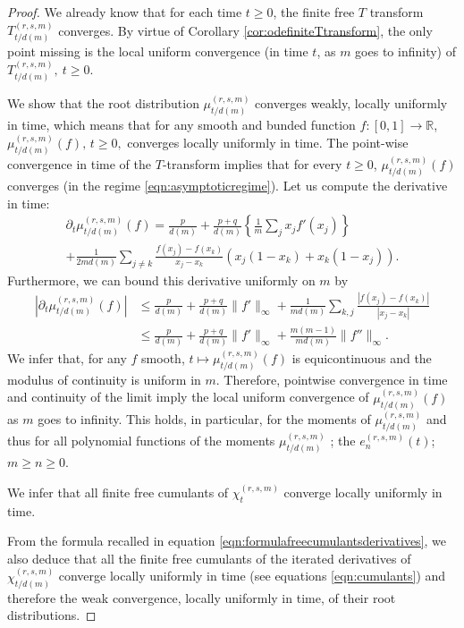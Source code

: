 \documentclass[12pt,reqno]{amsart}
\begin{document}
\begin{proof}
We already know that for each time $t \geq 0$, the finite free $T$ transform $T^{(r,s,m)}_{t/d(m)}$ converges. By virtue of Corollary \ref{cor:odefiniteTtransform}, the only point missing is the local uniform convergence (in time $t$, as $m$ goes to infinity) of $T^{(r,s,m)}_{t/d(m)},~t\geq 0$.  

We show that the root distribution $\mu^{(r,s,m)}_{t/d(m)}$ converges weakly, locally uniformly in time, which means that for any smooth and bunded function $f: [0,1]\to\mathbb{R}$, 
$
\mu_{t/d(m)}^{(r,s,m)}(f),\, t\geq 0,
$
converges locally uniformly in time. The point-wise convergence in time of the $T$-transform implies that for every $t \geq 0$, $\mu_{t/d(m)}^{(r,s,m)}(f)$ converges (in the regime \ref{eqn:asymptoticregime}). Let us compute the derivative in time:
\begin{multline*}
		\partial_t\mu^{(r,s,m)}_{t/d(m)}(f) = \frac{p}{d(m)} + \frac{p+q}{d(m)}\left\{\frac{1}{m}\sum_{j}x_jf'(x_j) \right\} \\
		+ \frac{1}{2md(m)} \sum_{j\neq k} \frac{f(x_j)-f(x_k)}{x_j-x_k}(x_j(1-x_k)+x_k(1-x_j)).
\end{multline*}
Furthermore, we can bound this derivative uniformly on $m$ by
\begin{align*}
		|\partial_t\mu^{(r,s,m)}_{t/d(m)}(f)| & \leq \frac{p}{d(m)} + \frac{p+q}{d(m)} \|f'\|_{\infty} + \frac{1}{md(m)} \sum_{k,j} \frac{|f(x_j)-f(x_k)|}{|x_j-x_k|} \\
		                               & \leq \frac{p}{d(m)} + \frac{p+q}{d(m)} \|f'\|_{\infty} + \frac{m(m-1)}{md(m)}\|f''\|_{\infty}.
\end{align*}
We infer that, for any $f$ smooth,
$
t\mapsto \mu_{t/d(m)}^{(r,s,m)}(f)
$
is equicontinuous and the modulus of continuity is uniform in $m$. Therefore, pointwise convergence in time and continuity of the limit imply the local uniform convergence of $\mu^{(r,s,m)}_{t/d(m)}(f)$ as $m$ goes to infinity. This holds, in particular, for the moments of $\mu^{(r,s,m)}_{t/d(m)}$ and thus for all polynomial functions of the moments $\mu^{(r,s,m)}_{t/d(m)}$ ; the $e^{(r,s,m)}_n(t)$; 
$m \geq n \geq 0$. 

We infer that all finite free cumulants of $\chi^{(r,s,m)}_t$ converge locally uniformly in time. 

From the formula recalled in equation \eqref{eqn:formulafreecumulantsderivatives}, we also deduce that all the finite free cumulants of the iterated derivatives of $\chi_{t/d(m)}^{(r,s,m)}$ converge locally uniformly in time (see equations \eqref{eqn:cumulants}) and therefore the weak convergence, locally uniformly in time, of their root distributions. 



\end{proof}
\end{document}
